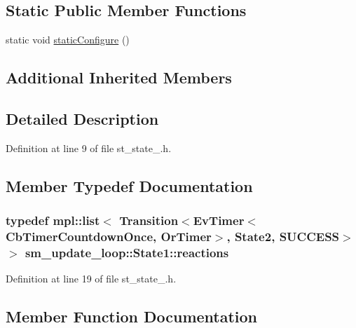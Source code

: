 \subsection*{Static Public Member Functions}
\begin{DoxyCompactItemize}
\item 
static void \hyperlink{structsm__update__loop_1_1State1_a54b1ae508eb3d814fb2d811d78298b0e}{static\+Configure} ()
\end{DoxyCompactItemize}
\subsection*{Additional Inherited Members}


\subsection{Detailed Description}


Definition at line 9 of file st\+\_\+state\+\_.\+h.



\subsection{Member Typedef Documentation}
\subsubsection[{\texorpdfstring{reactions}{reactions}}]{\setlength{\rightskip}{0pt plus 5cm}typedef mpl\+::list$<$ Transition$<${\bf Ev\+Timer}$<${\bf Cb\+Timer\+Countdown\+Once}, {\bf Or\+Timer}$>$, {\bf State2}, {\bf S\+U\+C\+C\+E\+SS}$>$ $>$ {\bf sm\+\_\+update\+\_\+loop\+::\+State1\+::reactions}}\hypertarget{structsm__update__loop_1_1State1_a828232579aa51d4fbfe9858c2a7016ad}{}\label{structsm__update__loop_1_1State1_a828232579aa51d4fbfe9858c2a7016ad}


Definition at line 19 of file st\+\_\+state\+\_.\+h.



\subsection{Member Function Documentation}
